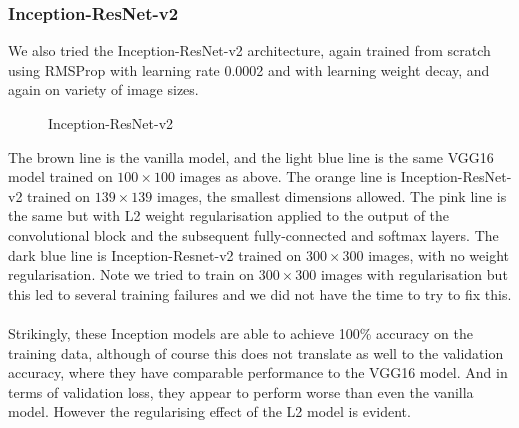 \documentclass[11pt]{article} %
\theoremstyle{plain}
\theoremstyle{definition}
\begin{document}
\newpage
\subsubsection{Inception-ResNet-v2}
We also tried the Inception-ResNet-v2 architecture, again trained from scratch using RMSProp with learning rate 0.0002 and with learning weight decay, and again on variety of image sizes.
\begin{figure}[!ht]
\centering
{}
\newline
{}
\caption{Inception-ResNet-v2}
\label{fig:IRVN2_Results}
\end{figure}
\FloatBarrier
\noindent
The brown line is the vanilla model, and the light blue line is the same VGG16 model trained on \(100 \times 100\) images as above. The orange line is Inception-ResNet-v2 trained on \(139 \times 139\) images, the smallest dimensions allowed. The pink line is the same but with L2 weight regularisation applied to the output of the convolutional block and the subsequent fully-connected and softmax layers. The dark blue line is Inception-Resnet-v2 trained on \(300 \times 300\) images, with no weight regularisation. Note we tried to train on \(300 \times 300\) images with regularisation but this led to several training failures and we did not have the time to try to fix this.
\\
\\
\noindent
Strikingly, these Inception models are able to achieve 100\% accuracy on the training data, although of course this does not translate as well to the validation accuracy, where they have comparable performance to the VGG16 model. And in terms of validation loss, they appear to perform worse than even the vanilla model. However the regularising effect of the L2 model is evident.
\end{document}

